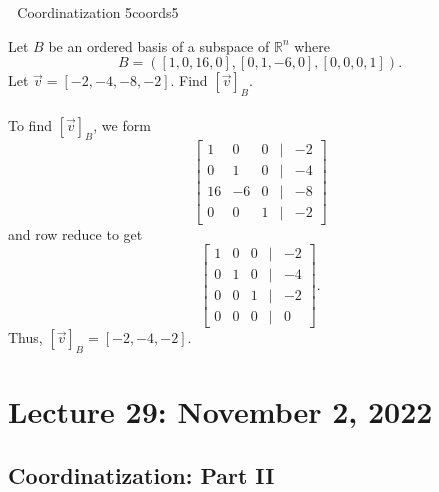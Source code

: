         \begin{example}{\Difficulty\,\Difficulty\,\Difficulty\,\,Coordinatization 5}{coords5}

            Let \(B\) be an ordered basis of a subspace of \(\mathbb{R}^n\) where
            \begin{equation*}
                B=([1,0,16,0],[0,1,-6,0],[0,0,0,1]).
            \end{equation*}
            Let \(\vec{v}=[-2,-4,-8,-2]\). Find \([\vec{v}]_B\).
            \\
            \\
            To find \([\vec{v}]_B\), we form
            \begin{equation*}
                \begin{bmatrix}
                    1 & 0 & 0 & | & -2 \\
                    0 & 1 & 0 & | & -4 \\
                    16 & -6 & 0 & | & -8 \\
                    0 & 0 & 1 & | & -2
                \end{bmatrix}
            \end{equation*}
            and row reduce to get
            \begin{equation*}
                \begin{bmatrix}
                    1 & 0 & 0 & | & -2 \\
                    0 & 1 & 0 & | & -4 \\
                    0 & 0 & 1 & | & -2 \\
                    0 & 0 & 0 & | & 0
                \end{bmatrix}.
            \end{equation*}
            Thus, \([\vec{v}]_B=[-2,-4,-2]\).
        \end{example}

\pagebreak

\section{Lecture 29: November 2, 2022}

    \subsection{Coordinatization: Part II}
        
